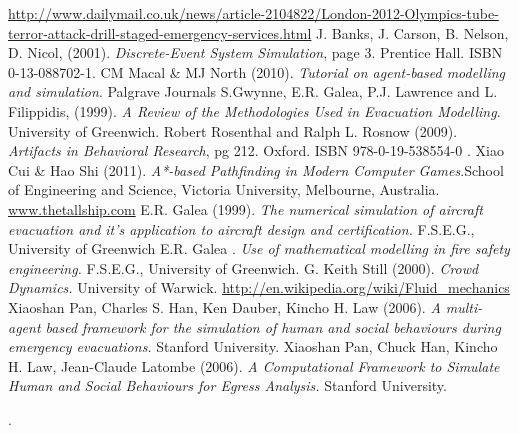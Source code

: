 \documentclass{article}
\begin{document}
\begin{thebibliography}{99}
 \url{http://www.dailymail.co.uk/news/article-2104822/London-2012-Olympics-tube-terror-attack-drill-staged-emergency-services.html}
J. Banks, J. Carson, B. Nelson, D. Nicol, (2001). \emph{Discrete-Event System Simulation}, page 3. Prentice Hall. ISBN 0-13-088702-1.
CM Macal & MJ North (2010). \emph{Tutorial on agent-based modelling and simulation}. Palgrave Journals
 S.Gwynne, E.R. Galea, P.J. Lawrence and L. Filippidis, (1999). \emph{A Review of the Methodologies Used in Evacuation Modelling}. University of Greenwich.
 Robert Rosenthal and Ralph L. Rosnow (2009). \emph{Artifacts in Behavioral Research}, pg 212. Oxford. ISBN 978-0-19-538554-0 .
Xiao Cui & Hao Shi (2011). \emph{A*-based Pathfinding in Modern Computer Games}.School of Engineering and Science, Victoria University, Melbourne, Australia.
\url{www.thetallship.com}
E.R. Galea (1999). \emph{The numerical simulation of aircraft evacuation and it's application to aircraft design and certification.} F.S.E.G., University of Greenwich
E.R. Galea . \emph{Use of mathematical modelling in fire safety engineering.} F.S.E.G., University of Greenwich.
G. Keith Still (2000). \emph{Crowd Dynamics.} University of Warwick.
 \url{http://en.wikipedia.org/wiki/Fluid_mechanics}
 Xiaoshan Pan, Charles S. Han, Ken Dauber, Kincho H. Law (2006). \emph{A multi-agent based framework for the simulation of human and social behaviours during emergency evacuations.} Stanford University.
 Xiaoshan Pan, Chuck Han, Kincho H. Law, Jean-Claude Latombe (2006). \emph{A Computational Framework to Simulate Human and Social Behaviours for Egress Analysis.} Stanford University.
\end{thebibliography}
.
\end{document}

